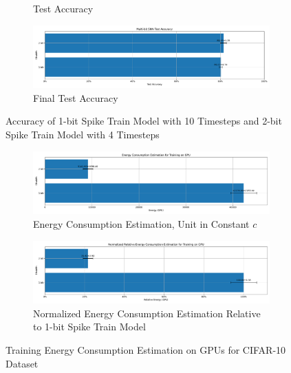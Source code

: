 \begin{figure}[H]
\begin{subfigure}[H]{0.48\textwidth}
                \caption{Test Accuracy}
            \end{subfigure}
            \hfill
            \begin{subfigure}[H]{\textwidth}
                \includegraphics[width=\textwidth]{../timesteps/CIFAR10/plots/cifar10_final_acc.pdf}
                \caption{Final Test Accuracy}
            \end{subfigure}
            \caption{Accuracy of 1-bit Spike Train Model with 10 Timesteps and 2-bit Spike Train Model with 4 Timesteps}
        \end{figure}

        \begin{figure}[H]
            \centering
            \begin{subfigure}[H]{0.48\textwidth}
                \includegraphics[width=\textwidth]{../timesteps/CIFAR10/plots/cifar10_train_energy_gpu.pdf}
                \caption{Energy Consumption Estimation, Unit in Constant $c$}
            \end{subfigure}
            \hfill
            \begin{subfigure}[H]{0.48\textwidth}
                \includegraphics[width=\textwidth]{../timesteps/CIFAR10/plots/cifar10_train_relative_energy_gpu.pdf}
                \caption{Normalized Energy Consumption Estimation Relative to 1-bit Spike Train Model}
            \end{subfigure}
            \caption{Training Energy Consumption Estimation on GPUs for CIFAR-10 Dataset}
        \end{figure}

